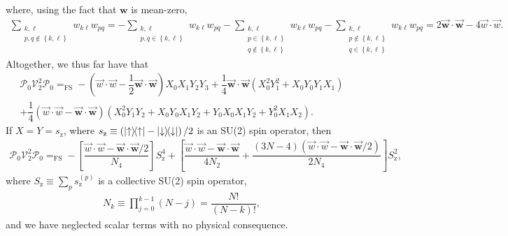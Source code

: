 \documentclass[nofootinbib,notitlepage,11pt]{revtex4-2}
\newcommand{\f}[2]{\dfrac{#1}{#2}} %
\newcommand{\p}[1]{\left(#1\right)} %
\renewcommand{\sp}[1]{\left[#1\right]} %
\renewcommand{\set}[1]{\left\{#1\right\}} %
\renewcommand{\c}{\cdot} %
\newcommand{\m}{\bm} %
\renewcommand{\v}{\vec} %
\newcommand{\1}{\mathds{1}}
\newcommand{\up}{\uparrow}
\newcommand{\dn}{\downarrow}
\newcommand{\z}{\text{z}}
\renewcommand{\P}{\mathcal{P}}
\newcommand{\V}{\mathcal{V}}
\newcommand{\EQFS}{=_{\text{FS}}}
\begin{document}
where, using the fact that $\m w$ is mean-zero,
\begin{align}
  \sum_{\substack{k,\ell\\p,q\notin\set{k,\ell}}} w_{k\ell} w_{pq}
  = - \sum_{\substack{k,\ell\\p,q\in\set{k,\ell}}} w_{k\ell} w_{pq}
  - \sum_{\substack{k,\ell\\p\in\set{k,\ell}\\q\notin\set{k,\ell}}}
  w_{k\ell} w_{pq}
  - \sum_{\substack{k,\ell\\p\notin\set{k,\ell}\\q\in\set{k,\ell}}}
  w_{k\ell} w_{pq}
  = 2 \v{\m w}\c\v{\m w} - 4 \v w\c\v w.
\end{align}
Altogether, we thus far have that
\begin{multline}
  \P_0 \V_2^2 \P_0
  \EQFS -\p{\v w\c\v w - \f12 \v{\m w}\c\v{\m w}} X_0 X_1 Y_2 Y_3
  + \f14 \v{\m w}\c\v{\m w} \p{X_0^2 Y_1^2 + X_0 Y_0 Y_1 X_1} \\
  + \f14 \p{\v w\c\v w - \v{\m w}\c\v{\m w}}
  \p{X_0^2 Y_1 Y_2 + X_0 Y_0 X_1 Y_2 + Y_0 X_0 X_1 Y_2 + Y_0^2 X_1 X_2}.
\end{multline}
If $X=Y=s_\z$, where $s_\z\equiv\p{\op\up-\op\dn}/2$ is an SU(2) spin
operator, then
\begin{align}
  \P_0 \V_2^2 \P_0
  \EQFS - \sp{\f{\v w\c\v w-\v{\m w}\c\v{\m w}/2}{N_4}} S_\z^4
  + \sp{\f{\v w\c\v w-\v{\m w}\c\v{\m w}}{4N_2}
    + \f{\p{3N-4}\p{\v w\c\v w - \v{\m w}\c\v{\m w}/2}}{2N_4}} S_\z^2,
\end{align}
where $S_\z\equiv\sum_p s_\z^{(p)}$ is a collective SU(2) spin
operator,
\begin{align}
  N_k \equiv \prod_{j=0}^{k-1} \p{N-j} = \f{N!}{\p{N-k}!},
\end{align}
and we have neglected scalar terms with no physical consequence.


\end{document}
